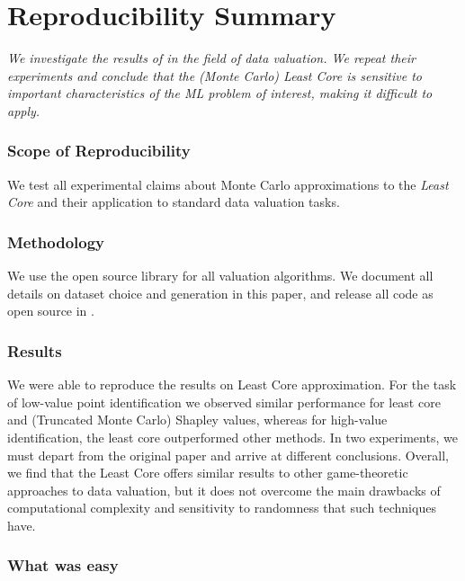 \section*{\centering Reproducibility Summary}

\textit{We investigate the results of \cite{yan_if_2021} in the field of data valuation. We repeat their experiments and conclude that the (Monte Carlo) Least Core is sensitive to important characteristics of the ML problem of interest, making it difficult to apply.}

\subsubsection*{Scope of Reproducibility}

We test all experimental claims about Monte Carlo approximations to the \textit{Least Core} and their application to standard data valuation tasks.

\subsubsection*{Methodology}

We use the open source library \cite{transferlab_pydvl_2022} for all valuation algorithms. We document all details on dataset choice and generation in this paper, and release all code as open source in \cite{benmerzoug_mlrc22_2022}.

\subsubsection*{Results}

We were able to reproduce the results on Least Core approximation. For the task of low-value point identification we observed similar performance for least core and (Truncated Monte Carlo) Shapley values, whereas for high-value identification, the least core outperformed other methods. In two experiments, we must depart from the original paper and arrive at different conclusions. Overall, we find that the Least Core offers similar results to other game-theoretic approaches to data valuation, but it does not overcome the main drawbacks of computational complexity and sensitivity to randomness that such techniques have.

\subsubsection*{What was easy}


